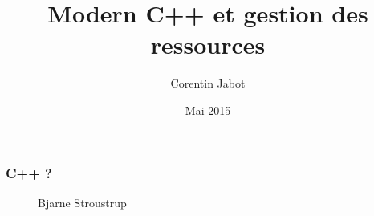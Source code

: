 \documentclass[xetex,mathserif]{beamer}
\title{Modern C++ et gestion des ressources}
\author{Corentin Jabot}
\date{Mai 2015}
\begin{document}
\NoAutoSpacing

\begin{frame}
\titlepage
\end{frame}


\begin{frame}
\frametitle{C++ ?}
\begin{figure}
  Bjarne Stroustrup
\end{figure}
\end{frame}
\end{document}
